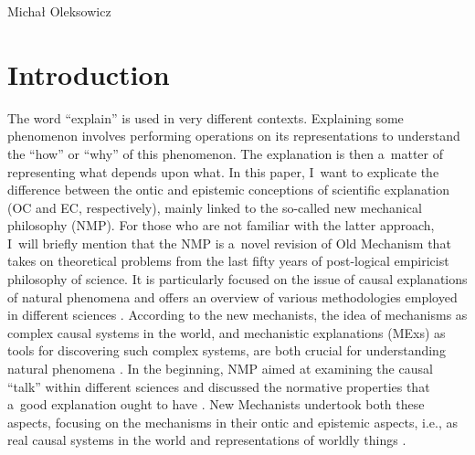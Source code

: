 \begin{artengenv}{Michał Oleksowicz}
\section{Introduction}
\lettrine[loversize=0.13,lines=2,lraise=-0.03,nindent=0em,findent=0.2pt]%
{T}{}he word ``explain'' is used in very different contexts. Explaining some phenomenon involves performing operations on its representations to understand the ``how'' or ``why'' of this phenomenon. The explanation is then a~matter of representing what depends upon what. In this paper, I~want to explicate the difference between the ontic and epistemic conceptions of scientific explanation (OC and EC, respectively), mainly linked to the so-called new mechanical philosophy (NMP). For those who are not familiar with the latter approach, I~will briefly mention that the NMP is a~novel revision of Old Mechanism that takes on theoretical problems from the last fifty years of post-logical empiricist philosophy of science. It is particularly focused on the issue of causal explanations of natural phenomena and offers an overview of various methodologies employed in different sciences
\parencites*[][]{andersen_field_2014}[][]{andersen_field_2014-1}. %
 According to the new mechanists, the idea of mechanisms as complex causal systems in the world, and mechanistic explanations (MExs) as tools for discovering such complex systems, are both crucial for understanding natural phenomena 
\parencite[][]{machamer_thinking_2000}. %
 In the beginning, NMP aimed at examining the causal ``talk'' within different sciences and discussed the normative properties that a~good explanation ought to have 
\parencite[][]{kaiser_ontic_2014}. %
 New Mechanists undertook both these aspects, focusing on the mechanisms in their ontic and epistemic aspects, i.e., as real causal systems in the world and representations of worldly things 
\parencites*[][]{bechtel_explanation_2005}[][]{craver_when_2006}[][]{darden_thinking_2008}[][]{campaner_mechanistic_2013}[][]{levy_three_2013}[][]{levy_machine-likeness_2014}.%



\end{artengenv}
